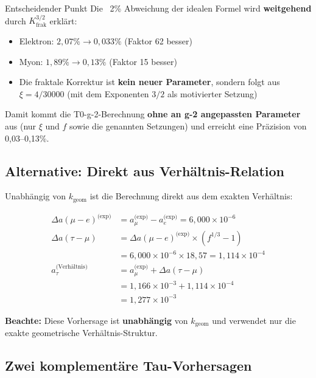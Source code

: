 	\begin{important}{Entscheidender Punkt}
		Die ~2\% Abweichung der idealen Formel wird \textbf{weitgehend} durch $K_\text{frak}^{3/2}$ erklärt:
		\begin{itemize}
			\item Elektron: $2{,}07\% \to 0{,}033\%$ (Faktor 62 besser)
			\item Myon: $1{,}89\% \to 0{,}13\%$ (Faktor 15 besser)
			\item Die fraktale Korrektur ist \textbf{kein neuer Parameter}, sondern folgt aus $\xi = 4/30000$ (mit dem Exponenten $3/2$ als motivierter Setzung)
		\end{itemize}
		
		Damit kommt die T0-g-2-Berechnung \textbf{ohne an g-2 angepassten Parameter} aus (nur $\xi$ und $f$ sowie die genannten Setzungen) und erreicht eine Präzision von 0{,}03--0{,}13\%.
	\end{important}
	
	\subsection{Alternative: Direkt aus Verhältnis-Relation}
	
	Unabhängig von $k_{\text{geom}}$ ist die Berechnung direkt aus dem exakten Verhältnis:
	
	\begin{align}
		\Delta a(\mu-e)^{\text{(exp)}} &= a_\mu^{\text{(exp)}} - a_e^{\text{(exp)}} = 6{,}000 \times 10^{-6} \\
		\Delta a(\tau-\mu) &= \Delta a(\mu-e)^{\text{(exp)}} \times (f^{1/3} - 1) \\
		&= 6{,}000 \times 10^{-6} \times 18{,}57 = 1{,}114 \times 10^{-4} \\
		a_\tau^{\text{(Verhältnis)}} &= a_\mu^{\text{(exp)}} + \Delta a(\tau-\mu) \\
		&= 1{,}166 \times 10^{-3} + 1{,}114 \times 10^{-4} \\
		&= \boxed{1{,}277 \times 10^{-3}}
	\end{align}
	
	\textbf{Beachte:} Diese Vorhersage ist \textbf{unabhängig} von $k_{\text{geom}}$ und verwendet nur die exakte geometrische Verhältnis-Struktur.
	
	\subsection{Zwei komplementäre Tau-Vorhersagen}
	
